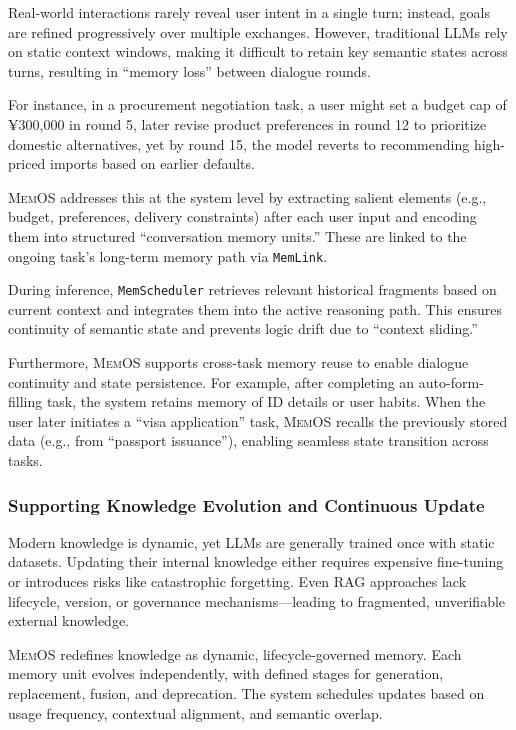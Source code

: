 \documentclass[]{memtensor}
\begin{document}
Real-world interactions rarely reveal user intent in a single turn; instead, goals are refined progressively over multiple exchanges. However, traditional LLMs rely on static context windows, making it difficult to retain key semantic states across turns, resulting in “memory loss” between dialogue rounds.

For instance, in a procurement negotiation task, a user might set a budget cap of ¥300,000 in round 5, later revise product preferences in round 12 to prioritize domestic alternatives, yet by round 15, the model reverts to recommending high-priced imports based on earlier defaults.

\textsc{MemOS} addresses this at the system level by extracting salient elements (e.g., budget, preferences, delivery constraints) after each user input and encoding them into structured “conversation memory units.” These are linked to the ongoing task’s long-term memory path via \texttt{MemLink}.

During inference, \texttt{MemScheduler} retrieves relevant historical fragments based on current context and integrates them into the active reasoning path. This ensures continuity of semantic state and prevents logic drift due to “context sliding.”

Furthermore, \textsc{MemOS} supports cross-task memory reuse to enable dialogue continuity and state persistence. For example, after completing an auto-form-filling task, the system retains memory of ID details or user habits. When the user later initiates a “visa application” task, \textsc{MemOS} recalls the previously stored data (e.g., from “passport issuance”), enabling seamless state transition across tasks.

\subsubsection{Supporting Knowledge Evolution and Continuous Update}

Modern knowledge is dynamic, yet LLMs are generally trained once with static datasets. Updating their internal knowledge either requires expensive fine-tuning or introduces risks like catastrophic forgetting. Even RAG approaches lack lifecycle, version, or governance mechanisms—leading to fragmented, unverifiable external knowledge.

\textsc{MemOS} redefines knowledge as dynamic, lifecycle-governed memory. Each memory unit evolves independently, with defined stages for generation, replacement, fusion, and deprecation. The system schedules updates based on usage frequency, contextual alignment, and semantic overlap.
\end{document}
